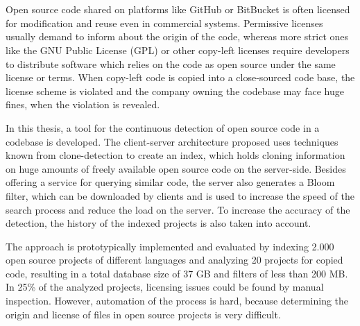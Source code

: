 \chapter{\abstractname}
Open source code shared on platforms like GitHub or BitBucket is often licensed for modification and reuse even in commercial systems.
Permissive licenses usually demand to inform about the origin of the code, whereas more strict ones like the GNU Public License (GPL) or other copy-left licenses require developers to distribute software which relies on the code as open source under the same license or terms.
When copy-left code is copied into a close-sourced code base, the license scheme is violated and the company owning the codebase may face huge fines, when the violation is revealed.

In this thesis, a tool for the continuous detection of open source code in a codebase is developed.
The client-server architecture proposed uses techniques known from clone-detection to create an index, which holds cloning information on huge amounts of freely available open source code on the server-side.
Besides offering a service for querying similar code, the server also generates a Bloom filter, which can be downloaded by clients and is used to increase the speed of the search process and reduce the load on the server.
To increase the accuracy of the detection, the history of the indexed projects is also taken into account.

The approach is prototypically implemented and evaluated by indexing 2.000 open source projects of different languages and analyzing 20 projects for copied code, resulting in a total database size of 37 GB and filters of less than 200 MB.
In 25\% of the analyzed projects, licensing issues could be found by manual inspection.
However, automation of the process is hard, because determining the origin and license of files in open source projects is very difficult.
